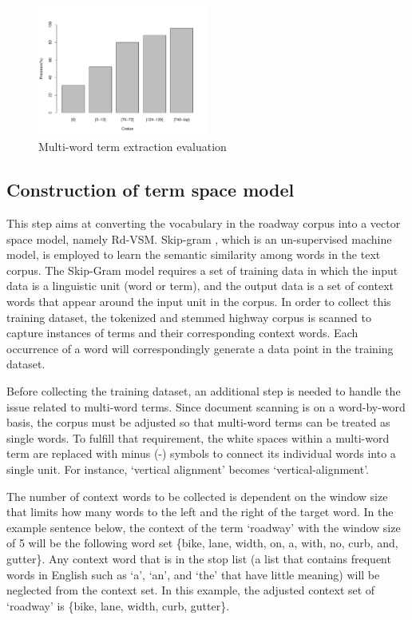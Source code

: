 \documentclass[Journal, BackFigs,NoLists, DoubleSpace]{ascelike}%
\begin{document}
\begin{figure}[t]
	\centering
	\includegraphics[width=0.5\textwidth]{Figure3_term_precision}
	\caption{Multi-word term extraction evaluation}
	\label{fig:term_precision}
\end{figure}
%
\subsection{Construction of term space model}
%
This step aims at converting the vocabulary in the roadway corpus into a vector space model, namely Rd-VSM. Skip-gram \cite{mikolov13a}, which is an un-supervised machine model, is employed to learn the semantic similarity among words in the text corpus. The Skip-Gram model requires a set of training data in which the input data is a linguistic unit (word or term), and the output data is a set of context words that appear around the input unit in the corpus. In order to collect this training dataset, the tokenized and stemmed highway corpus is scanned to capture instances of terms and their corresponding context words. Each occurrence of a word will correspondingly generate a data point in the training dataset.
\par
Before collecting the training dataset, an additional step is needed to handle the issue related to multi-word terms. Since document scanning is on a word-by-word basis, the corpus must be adjusted so that multi-word terms can be treated as single words. To fulfill that requirement, the white spaces within a multi-word term are replaced with minus (-) symbols to connect its individual words into a single unit. For instance, `vertical alignment' becomes `vertical-alignment'.
\par
The number of context words to be collected is dependent on the window size that limits how many words to the left and the right of the target word. In the example sentence below, the context of the term `roadway' with the window size of 5 will be the following word set \{bike, lane, width, on, a, with, no, curb, and, gutter\}. Any context word that is in the stop list (a list that contains frequent words in English such as `a', `an', and `the' that have little meaning) will be neglected from the context set. In this example, the adjusted context set of `roadway' is \{bike, lane, width, curb, gutter\}.
\end{document}
